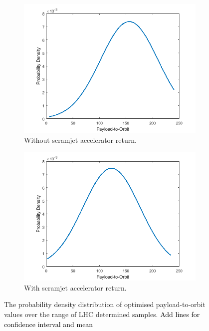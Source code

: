 \begin{figure}[ht]
	\centering
	\begin{subfigure}{.45\textwidth}
	\includegraphics[width=0.99\linewidth]{figures/A1_uncertainty-analysis/PDFNoReturn}
	\caption{Without scramjet accelerator return.}
	\end{subfigure}
	\begin{subfigure}{.45\textwidth}
		\includegraphics[width=0.99\linewidth]{figures/A1_uncertainty-analysis/PDFReturn}
		\caption{With scramjet accelerator return.}
	\end{subfigure}
	\caption{The probability density distribution of optimised payload-to-orbit values over the range of LHC determined samples. \textcolor{black}{Add lines for confidence interval and mean}}
	\label{fig:PDFNoReturn}
\end{figure}

